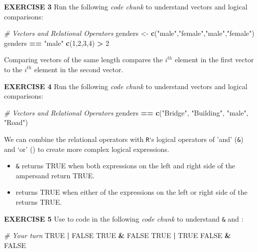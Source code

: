\documentclass[
]{article}
\newenvironment{Shaded}{\begin{snugshade}}{\end{snugshade}}
\newcommand{\CommentTok}[1]{\textcolor[rgb]{0.56,0.35,0.01}{\textit{#1}}}
\newcommand{\DecValTok}[1]{\textcolor[rgb]{0.00,0.00,0.81}{#1}}
\newcommand{\KeywordTok}[1]{\textcolor[rgb]{0.13,0.29,0.53}{\textbf{#1}}}
\newcommand{\NormalTok}[1]{#1}
\newcommand{\OperatorTok}[1]{\textcolor[rgb]{0.81,0.36,0.00}{\textbf{#1}}}
\newcommand{\OtherTok}[1]{\textcolor[rgb]{0.56,0.35,0.01}{#1}}
\newcommand{\StringTok}[1]{\textcolor[rgb]{0.31,0.60,0.02}{#1}}
\begin{document}
\textbf{EXERCISE 3} Run the following \emph{code chunk} to understand
vectors and logical comparisons:

\begin{Shaded}
\begin{Highlighting}[]
\CommentTok{# Vectors and Relational Operators}
\NormalTok{genders <-}\StringTok{ }\KeywordTok{c}\NormalTok{(}\StringTok{"male"}\NormalTok{,}\StringTok{"female"}\NormalTok{,}\StringTok{"male"}\NormalTok{,}\StringTok{"female"}\NormalTok{)}
\NormalTok{genders }\OperatorTok{==}\StringTok{ "male"}
\KeywordTok{c}\NormalTok{(}\DecValTok{1}\NormalTok{,}\DecValTok{2}\NormalTok{,}\DecValTok{3}\NormalTok{,}\DecValTok{4}\NormalTok{) }\OperatorTok{>}\StringTok{ }\DecValTok{2}
\end{Highlighting}
\end{Shaded}

Comparing vectors of the same length compares the \(i^{th}\) element in
the first vector to the \(i^{th}\) element in the second vector.

\textbf{EXERCISE 4} Run the following \emph{code chunk} to understand
vectors and logical comparisons:

\begin{Shaded}
\begin{Highlighting}[]
\CommentTok{# Vectors and Relational Operators}
\NormalTok{genders }\OperatorTok{==}\StringTok{ }\KeywordTok{c}\NormalTok{(}\StringTok{"Bridge"}\NormalTok{, }\StringTok{"Building"}\NormalTok{, }\StringTok{"male"}\NormalTok{, }\StringTok{"Road"}\NormalTok{)}
\end{Highlighting}
\end{Shaded}

We can combine the relational operators with \texttt{R}`s logical
operators of 'and' (\texttt{\&}) and `or' (\texttt{\textbar{}}) to
create more complex logical expressions.

\begin{itemize}
\item
  \texttt{\&} returns TRUE when both expressions on the left and right
  side of the ampersand return TRUE.
\item
  \texttt{\textbar{}} returns TRUE when either of the expressions on the
  left or right side of the \texttt{\textbar{}} returns TRUE.
\end{itemize}

\textbf{EXERCISE 5} Use to code in the following \emph{code chunk} to
understand \texttt{\&} and \texttt{\textbar{}}:

\begin{Shaded}
\begin{Highlighting}[]
\CommentTok{# Your turn}
\OtherTok{TRUE} \OperatorTok{|}\StringTok{ }\OtherTok{FALSE}
\OtherTok{TRUE} \OperatorTok{&}\StringTok{ }\OtherTok{FALSE}
\OtherTok{TRUE} \OperatorTok{|}\StringTok{ }\OtherTok{TRUE}
\OtherTok{FALSE} \OperatorTok{&}\StringTok{ }\OtherTok{FALSE}
\end{Highlighting}
\end{Shaded}
\end{document}
